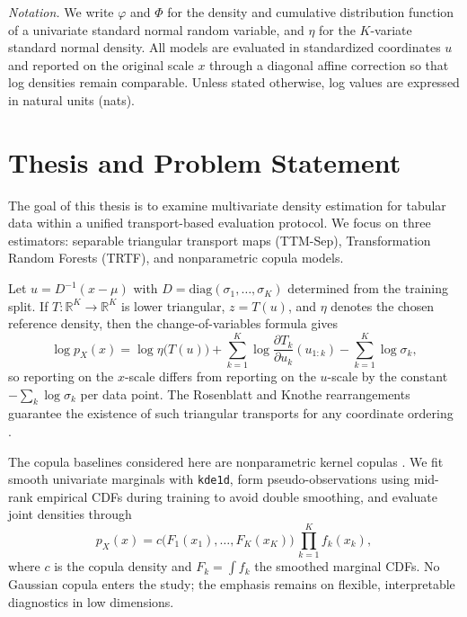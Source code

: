 \documentclass[11pt,a4paper,twoside]{book}\usepackage[]{graphicx}\usepackage[]{xcolor}
\begin{document}
\medskip
\noindent\textit{Notation.} We write $\varphi$ and $\Phi$ for the density and cumulative distribution function of a univariate standard normal random variable, and $\eta$ for the $K$-variate standard normal density. All models are evaluated in standardized coordinates $u$ and reported on the original scale $x$ through a diagonal affine correction so that log densities remain comparable. Unless stated otherwise, log values are expressed in natural units (nats).

\section{Thesis and Problem Statement}\label{sec:ch1-problem}

The goal of this thesis is to examine multivariate density estimation for tabular data within a unified transport-based evaluation protocol. We focus on three estimators: separable triangular transport maps (TTM-Sep), Transformation Random Forests (TRTF), and nonparametric copula models.

Let $u = D^{-1}(x - \mu)$ with $D = \mathrm{diag}(\sigma_1,\ldots,\sigma_K)$ determined from the training split. If $T: \mathbb{R}^K \to \mathbb{R}^K$ is lower triangular, $z = T(u)$, and $\eta$ denotes the chosen reference density, then the change-of-variables formula gives
\begin{equation}
  \log p_X(x) = \log \eta\big(T(u)\big) + \sum_{k=1}^{K} \log \frac{\partial T_k}{\partial u_k}(u_{1:k}) - \sum_{k=1}^{K} \log \sigma_k,
  \label{eq:ch1-change-of-variables}
\end{equation}
so reporting on the $x$-scale differs from reporting on the $u$-scale by the constant $-\sum_k \log \sigma_k$ per data point. The Rosenblatt and Knothe rearrangements guarantee the existence of such triangular transports for any coordinate ordering \citep{rosenblatt1952remarks,knothe1957contributions}.

The copula baselines considered here are nonparametric kernel copulas \citep{nagler2017kdecopula}. We fit smooth univariate marginals with \texttt{kde1d}, form pseudo-observations using mid-rank empirical CDFs during training to avoid double smoothing, and evaluate joint densities through
\[
  p_X(x) = c\big(F_1(x_1),\ldots,F_K(x_K)\big)\, \prod_{k=1}^{K} f_k(x_k),
\]
where $c$ is the copula density and $F_k = \int f_k$ the smoothed marginal CDFs. No Gaussian copula enters the study; the emphasis remains on flexible, interpretable diagnostics in low dimensions.
\end{document}
